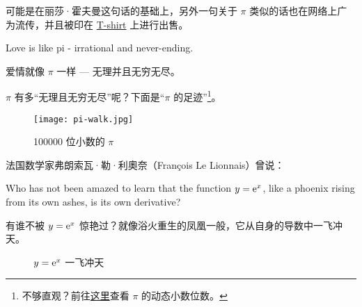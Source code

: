 \documentclass[12pt, cn]{elegantart}
\begin{document}
可能是在丽莎·霍夫曼这句话的基础上，另外一句关于 $\pi$ 类似的话也在网络上广为流传，并且被印在 \href{https://teespring.com/shop/love-pi-math}{T-shirt} 上进行出售。
\vspace{5pt}

\begin{tcolorbox}[saying]
Love is like pi - irrational and never-ending.
\vspace{5pt}

爱情就像 $\pi$ 一样 --- 无理并且无穷无尽。
\end{tcolorbox}

$\pi$ 有多“无理且无穷无尽”呢？下面是“$\pi$ 的足迹”\footnote{不够直观？前往{\href{https://nbremer.github.io/freshdatashapes/\#/pi-walk}{这里}}查看 $\pi$ 的动态小数位数。}。

\begin{figure}[h]
	\centering
	\texttt{[image: pi-walk.jpg]}
	\caption{100000 位小数的 $\pi$}
\end{figure}

\noindent 法国数学家弗朗索瓦·勒·利奧奈（Fran{\c{c}}ois Le Lionnais）\cite{le2004}曾说：
\vspace{5pt}

\begin{tcolorbox}[saying]
   Who has not been amazed to learn that the function $y = \mathrm{e}^x$, like a phoenix rising from its own ashes, is its own derivative? \vspace{5pt}

   有谁不被 $y = \mathrm{e}^x$ 惊艳过？就像浴火重生的凤凰一般，它从自身的导数中一飞冲天。
\end{tcolorbox}

\begin{figure}[h]
\centering
\caption{$y = \mathrm{e}^x$ 一飞冲天}
\end{figure}
\end{document}
